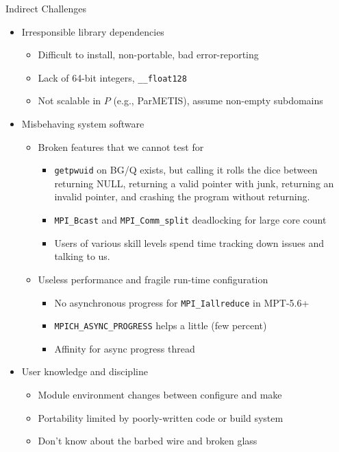 \documentclass{beamer}
\begin{document}
\begin{frame}{Indirect Challenges}
  \begin{itemize}
  \item Irresponsible library dependencies
    \begin{itemize}
    \item Difficult to install, non-portable, bad error-reporting
    \item Lack of 64-bit integers, \texttt{\_\_float128}
    \item Not scalable in $P$ (e.g., ParMETIS), assume non-empty subdomains
    \end{itemize}
  \item Misbehaving system software
    \begin{itemize}
    \item Broken features that we cannot test for
      \begin{itemize}
      \item \texttt{getpwuid} on BG/Q exists, but calling it rolls the
        dice between returning NULL, returning a valid pointer with
        junk, returning an invalid pointer, and crashing the program
        without returning.
      \item \texttt{MPI\_Bcast} and \texttt{MPI\_Comm\_split}
        deadlocking for large core count
      \item Users of various skill levels spend time tracking down
        issues and talking to us.
      \end{itemize}
    \item Useless performance and fragile run-time configuration
      \begin{itemize}
      \item No asynchronous progress for \texttt{MPI\_Iallreduce} in MPT-5.6+
      \item \texttt{MPICH\_ASYNC\_PROGRESS} helps a little (few percent)
      \item Affinity for async progress thread
      \end{itemize}
    \end{itemize}
  \item User knowledge and discipline
    \begin{itemize}
    \item Module environment changes between configure and make
    \item Portability limited by poorly-written code or build system
    \item Don't know about the barbed wire and broken glass
    \end{itemize}
  \end{itemize}
\end{frame}
\end{document}
